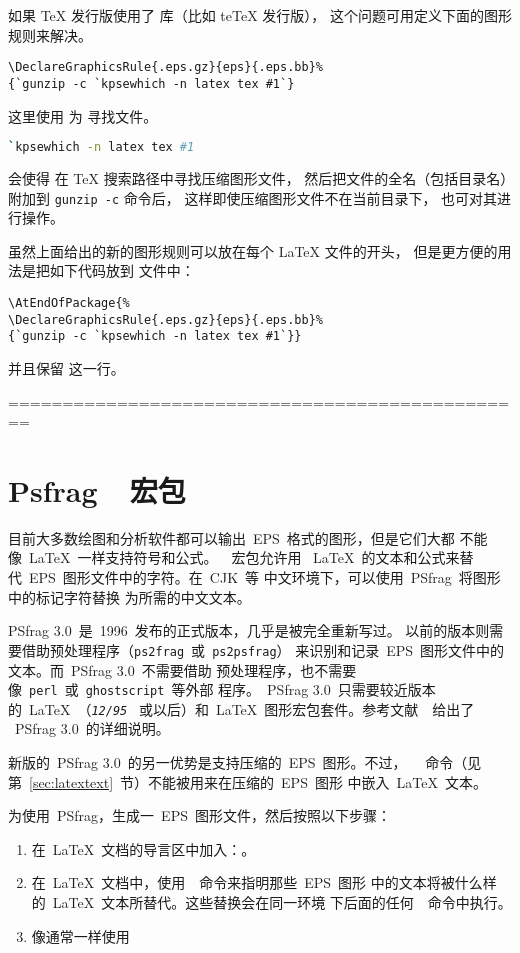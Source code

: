 如果 \TeX{} 发行版使用了  库（比如 te\TeX{} 发行版），
这个问题可用定义下面的图形规则来解决。
\begin{lstlisting}
\DeclareGraphicsRule{.eps.gz}{eps}{.eps.bb}%
{`gunzip -c `kpsewhich -n latex tex #1`}
\end{lstlisting}
这里使用  为  寻找文件。
\begin{lstlisting}[language=bash]
`kpsewhich -n latex tex #1
\end{lstlisting}
会使得  在 \TeX{} 搜索路径中寻找压缩图形文件，
然后把文件的全名（包括目录名）附加到 \texttt{gunzip -c} 命令后，
这样即使压缩图形文件不在当前目录下， 也可对其进行操作。

虽然上面给出的新的图形规则可以放在每个 \LaTeX{} 文件的开头，
但是更方便的用法是把如下代码放到  文件中：
\begin{lstlisting}
\AtEndOfPackage{%
\DeclareGraphicsRule{.eps.gz}{eps}{.eps.bb}%
{`gunzip -c `kpsewhich -n latex tex #1`}}
\end{lstlisting}
并且保留  这一行。

================================================
\section{Psfrag~~宏包}\label{sec:psfrag}

目前大多数绘图和分析软件都可以输出~EPS~格式的图形，但是它们大都
不能像~\LaTeX{}~一样支持符号和公式。~~宏包允许用
~\LaTeX{}~的文本和公式来替代~EPS~图形文件中的字符。在~CJK~等
中文环境下，可以使用~\textsf{PSfrag}~将图形中的标记字符替换
为所需的中文文本。

\textsf{PSfrag 3.0}~是~1996~发布的正式版本，几乎是被完全重新写过。
以前的版本则需要借助预处理程序（\texttt{ps2frag}~或~\texttt{ps2psfrag}）
来识别和记录~EPS~图形文件中的文本。而~\textsf{PSfrag 3.0}~不需要借助
预处理程序，也不需要像~\texttt{perl}~或~\texttt{ghostscript}~等外部
程序。~\textsf{PSfrag 3.0}~只需要较近版本的~\LaTeX{}~（\texttt{\textit{12/95}}
~或以后）和~\LaTeX{}~图形宏包套件。参考文献~\cite{psfrag}~给出了
~\textsf{PSfrag 3.0}~的详细说明。

新版的~\textsf{PSfrag 3.0}~的另一优势是支持压缩的~EPS~图形。不过，
~~命令（见第~\ref{sec:latextext}~节）不能被用来在压缩的~EPS~图形
中嵌入~\LaTeX{}~文本。

为使用~\textsf{PSfrag}，生成一~EPS~图形文件，然后按照以下步骤：
\begin{enumerate}
\item 在~\LaTeX{}~文档的导言区中加入：。
\item 在~\LaTeX{}~文档中，使用~~命令来指明那些~EPS~图形
      中的文本将被什么样的~\LaTeX{}~文本所替代。这些替换会在同一环境
      下后面的任何~~命令中执行。
\item 像通常一样使用~
\end{enumerate}

